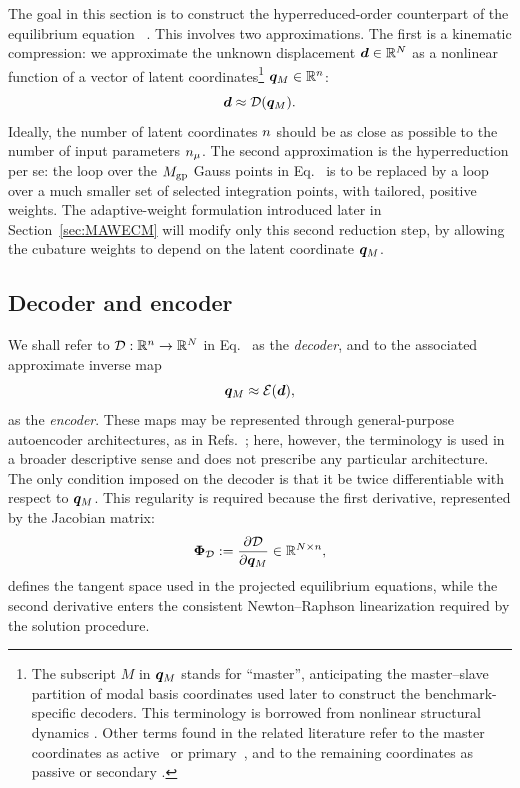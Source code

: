 \documentclass[preprint,10pt]{elsarticle}  %
\begin{document}
The goal in this section is to construct the hyperreduced-order counterpart of the equilibrium equation    ~. This involves two approximations. The first is a kinematic compression:  we approximate the unknown displacement $\bm{d} \in \mathbb{R}^{N}$ as a nonlinear function of a vector of  latent coordinates\footnote{The subscript \(M\) in $\bm{q}_M$ stands for ``master'', anticipating the
master--slave partition of modal basis coordinates    used later to
construct the benchmark-specific decoders.  This
terminology is borrowed from nonlinear structural dynamics
\cite{touze2021model,vizzaccaro2020comparison}. Other terms found in the related literature refer to the master
coordinates as active~\cite{zuo2026nonlinear,callaham2022role} or
primary~\cite{ares2026nonlinear}, and to the remaining coordinates as
passive \cite{zuo2026nonlinear} or secondary \cite{ares2026nonlinear}.      } $\bm{q}_M \in \mathbb{R}^{n}$:
\begin{equation}
\label{eq:dredNON}
\bm{d} \approx \mathcal{\boldsymbol{D}}(\bm{q}_M).
\end{equation}
Ideally, the number of latent coordinates $n$ should be as close as possible to  the number of input parameters  $n_{\mu}$.  The second approximation is the hyperreduction per se: the loop over the \(M_{\mathrm{gp}}\) Gauss points in
Eq.~ is to be replaced by a loop over a much
smaller set of selected integration points, with tailored,   positive weights.   The adaptive-weight
formulation introduced later in Section~\ref{sec:MAWECM} will modify only this second reduction step, by
allowing the cubature weights to depend on the latent coordinate $\bm{q}_M$.
\subsection{Decoder and encoder}
\label{sec:decoderENCODER}



We shall refer to \(\mathcal{\boldsymbol{D}}:\mathbb{R}^{n}\rightarrow\mathbb{R}^{N}\) in
Eq.~ as the \emph{decoder}, and to the associated approximate
inverse map
\begin{equation}
\label{eq:inversemapping}
\bm{q}_M \approx \mathcal{\boldsymbol{E}}(\bm{d}),
\end{equation}
as the \emph{encoder}. These maps may be represented through general-purpose autoencoder
architectures, as in Refs.~\cite{lee2019model,fresca2021comprehensive};
here, however, the terminology is used in a broader descriptive sense and
does not prescribe any particular architecture.   The only condition imposed on the decoder is that it be twice
differentiable with respect to \(\bm{q}_M\). This regularity is required
because the first derivative, represented by the Jacobian matrix:
\begin{equation}
\label{eq:PhiD_definition}
\bm{\Phi}_{\mathcal{D}}
:=
\dfrac{\partial \mathcal{\boldsymbol{D}}}{\partial \bm{q}_M}
\in \mathbb{R}^{N\times n},
\end{equation}
defines
the tangent space used in the projected equilibrium equations, while the
second derivative   enters the consistent Newton--Raphson linearization required by the solution procedure.
\end{document}
